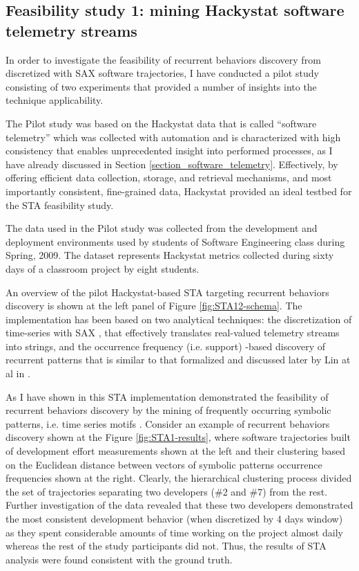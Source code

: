\subsection{Feasibility study 1: mining Hackystat software telemetry streams}
In order to investigate the feasibility of recurrent behaviors discovery from discretized with 
SAX \cite{citeulike:2821475} software trajectories, I have conducted a pilot study consisting of two experiments that provided a number 
of insights into the technique applicability.  

The Pilot study was based on the Hackystat data that is called ``software telemetry'' \cite{citeulike:12929227} which was collected 
with automation and is characterized with high consistency that enables unprecedented insight into performed processes, 
as I have already discussed in Section \ref{section_software_telemetry}. 
Effectively, by offering efficient data collection, storage, and retrieval mechanisms, and most importantly consistent, fine-grained data, 
Hackystat provided an ideal testbed for the STA feasibility study.

The data used in the Pilot study was collected from the development and deployment environments used by students of Software Engineering 
class during Spring, 2009. The dataset represents Hackystat metrics collected during sixty days of a classroom project by eight students. 

An overview of the pilot Hackystat-based STA targeting recurrent behaviors discovery is shown at the left panel of Figure  
\ref{fig:STA12-schema}. The implementation has been based on two analytical techniques: the discretization of time-series with 
SAX \cite{sax}, that effectively translates real-valued telemetry streams into strings, and the occurrence frequency (i.e. support) -based 
discovery of recurrent patterns that is similar to that formalized and discussed later by Lin at al in \cite{citeulike:10525778}. 

As I have shown in \cite{csdl2-10-09} this STA implementation demonstrated the feasibility of recurrent behaviors discovery 
by the mining of frequently occurring symbolic patterns, i.e. time series motifs \cite{sax}. 
Consider an example of recurrent behaviors discovery shown at the Figure \ref{fig:STA1-results}, where software 
trajectories built of development effort measurements shown at the left and their clustering based on the Euclidean distance 
between vectors of symbolic patterns occurrence frequencies shown at the right. Clearly, the hierarchical clustering 
process divided the set of trajectories separating two developers (\#2 and \#7) from the rest. 
Further investigation of the data revealed that these two developers demonstrated the most consistent development 
behavior (when discretized by 4 days window) as they spent considerable amounts of time working on the project almost daily
whereas the rest of the study participants did not. Thus, the results of STA analysis were found consistent with the ground truth.

